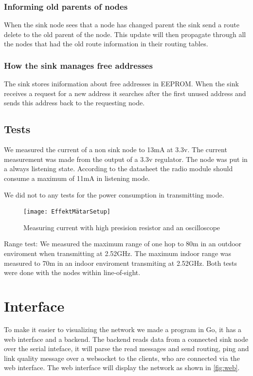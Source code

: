\documentclass[a4paper,11pt]{article}
\begin{document}
\subsubsection{Informing old parents of nodes}
When the sink node sees that a node has changed parent the sink send a
route delete to the old parent of the node. This update will then
propagate through all the nodes that had the old route information in
their routing tables.

\subsubsection{How the sink manages free addresses}
The sink stores iniformation about free addresses in EEPROM.  When the
sink receives a request for a new address it searches after the first
unused address and sends this address back to the requesting node.

\subsection{Tests}
We measured the current of a non sink node to 13mA at 3.3v. The
current measurement was made from the output of a 3.3v regulator.
The node was put in a always listening state. According to the
datasheet the radio module should consume a maximum of 11mA in
listening mode.

We did not to any tests for the power consumption in transmitting
mode.

\begin{figure}[h!]
  \texttt{[image: EffektMätarSetup]}
  \caption{Measuring current with high presision resistor and an oscilloscope}
  \label{fig:Effekt}
\end{figure}

Range test:
We measured the maximum range of one hop to 80m in an outdoor 
enviroment when transmitting at 2.52GHz. 
The maximum indoor range was measured to 70m in an indoor
enviroment transmiting at 2.52GHz. Both tests were done with the nodes within line-of-sight.



\section{Interface}

To make it easier to visualizing the network we made a program in Go,
it has a web interface and a backend. The backend reads data from a
connected sink node over the serial inteface, it will parse the read
messages and send routing, ping and link quality message over a
websocket to the clients, who are connected via the web interface. The
web interface will display the network as shown in \autoref{fig:web}.
\end{document}
